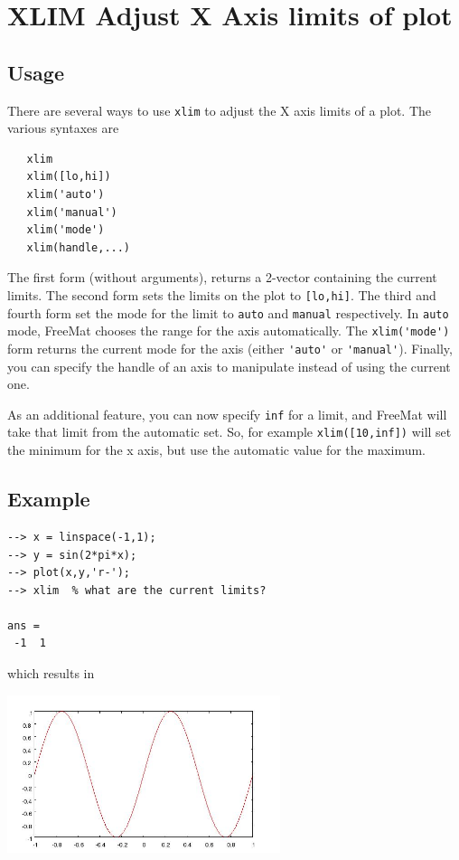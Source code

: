 \section{XLIM Adjust X Axis limits of plot}

\subsection{Usage}

There are several ways to use \verb|xlim| to adjust the X axis limits of
a plot.  The various syntaxes are
\begin{verbatim}
   xlim
   xlim([lo,hi])   
   xlim('auto')
   xlim('manual')
   xlim('mode')
   xlim(handle,...)
\end{verbatim}
The first form (without arguments), returns a 2-vector containing the
current limits.  The second form sets the limits on the plot to \verb|[lo,hi]|.
The third and fourth form set the mode for the limit to \verb|auto| and \verb|manual|
respectively.  In \verb|auto| mode, FreeMat chooses the range for the axis 
automatically.  The \verb|xlim('mode')| form returns the current mode for the axis
(either \verb|'auto'| or \verb|'manual'|).  Finally, you can specify the handle of an
axis to manipulate instead of using the current one.

As an additional feature, you can now specify \verb|inf| for a limit, and
FreeMat will take that limit from the automatic set.  So, for example 
\verb|xlim([10,inf])| will set the minimum for the x axis, but use the
automatic value for the maximum.
\subsection{Example}

\begin{verbatim}
--> x = linspace(-1,1);
--> y = sin(2*pi*x);
--> plot(x,y,'r-');
--> xlim  % what are the current limits?

ans = 
 -1  1 
\end{verbatim}
which results in


\centerline{\includegraphics[width=8cm]{xlim1}}

